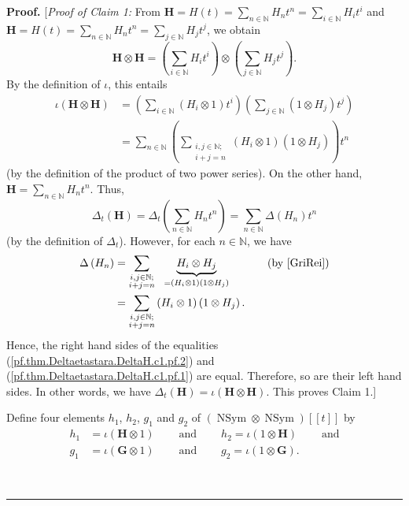 \documentclass[numbers=enddot,12pt,final,onecolumn,notitlepage]{scrartcl}%
\theoremstyle{definition}
\newenvironment{proof}[1][Proof]{\noindent\textbf{#1.} }{\ \rule{0.5em}{0.5em}}
\let\sumnonlimits\sum
\renewcommand{\sum}{\sumnonlimits\limits}
\begin{document}
\begin{proof}
[\textit{Proof of Claim 1:} From $\mathbf{H}=H\left(  t\right)  =\sum
_{n\in\mathbb{N}}H_{n}t^{n}=\sum_{i\in\mathbb{N}}H_{i}t^{i}$ and
$\mathbf{H}=H\left(  t\right)  =\sum_{n\in\mathbb{N}}H_{n}t^{n}=\sum
_{j\in\mathbb{N}}H_{j}t^{j}$, we obtain%
\[
\mathbf{H}\otimes\mathbf{H}=\left(  \sum_{i\in\mathbb{N}}H_{i}t^{i}\right)
\otimes\left(  \sum_{j\in\mathbb{N}}H_{j}t^{j}\right)  .
\]
By the definition of $\iota$, this entails%
\begin{align}
\iota\left(  \mathbf{H}\otimes\mathbf{H}\right)   &  =\left(  \sum
_{i\in\mathbb{N}}\left(  H_{i}\otimes1\right)  t^{i}\right)  \left(
\sum_{j\in\mathbb{N}}\left(  1\otimes H_{j}\right)  t^{j}\right) \nonumber\\
&  =\sum_{n\in\mathbb{N}}\left(  \sum_{\substack{i,j\in\mathbb{N}%
;\\i+j=n}}\left(  H_{i}\otimes1\right)  \left(  1\otimes H_{j}\right)
\right)  t^{n} \label{pf.thm.Deltaetastara.DeltaH.c1.pf.1}%
\end{align}
(by the definition of the product of two power series). On the other hand,
$\mathbf{H}=\sum_{n\in\mathbb{N}}H_{n}t^{n}$. Thus,%
\begin{equation}
\Delta_{t}\left(  \mathbf{H}\right)  =\Delta_{t}\left(  \sum_{n\in\mathbb{N}%
}H_{n}t^{n}\right)  =\sum_{n\in\mathbb{N}}\Delta\left(  H_{n}\right)  t^{n}
\label{pf.thm.Deltaetastara.DeltaH.c1.pf.2}%
\end{equation}
(by the definition of $\Delta_{t}$). However, for each $n\in\mathbb{N}$, we
have%
\begin{align*}
\Delta\left(  H_{n}\right)   &  =\sum_{\substack{i,j\in\mathbb{N}%
;\\i+j=n}}\ \ \underbrace{H_{i}\otimes H_{j}}_{=\left(  H_{i}\otimes1\right)
\left(  1\otimes H_{j}\right)  }\ \ \ \ \ \ \ \ \ \ \left(  \text{by
\cite[(5.4.2)]{GriRei}}\right) \\
&  =\sum_{\substack{i,j\in\mathbb{N};\\i+j=n}}\left(  H_{i}\otimes1\right)
\left(  1\otimes H_{j}\right)  .
\end{align*}
Hence, the right hand sides of the equalities
(\ref{pf.thm.Deltaetastara.DeltaH.c1.pf.2}) and
(\ref{pf.thm.Deltaetastara.DeltaH.c1.pf.1}) are equal. Therefore, so are their
left hand sides. In other words, we have $\Delta_{t}\left(  \mathbf{H}\right)
=\iota\left(  \mathbf{H}\otimes\mathbf{H}\right)  $. This proves Claim 1.]
\medskip

Define four elements $h_{1}$, $h_{2}$, $g_{1}$ and $g_{2}$ of $\left(
\operatorname*{NSym}\otimes\operatorname*{NSym}\right)  \left[  \left[
t\right]  \right]  $ by%
\begin{align*}
h_{1}  &  =\iota\left(  \mathbf{H}\otimes1\right)
\ \ \ \ \ \ \ \ \ \ \text{and}\ \ \ \ \ \ \ \ \ \ h_{2}=\iota\left(
1\otimes\mathbf{H}\right)  \ \ \ \ \ \ \ \ \ \ \text{and}\\
g_{1}  &  =\iota\left(  \mathbf{G}\otimes1\right)
\ \ \ \ \ \ \ \ \ \ \text{and}\ \ \ \ \ \ \ \ \ \ g_{2}=\iota\left(
1\otimes\mathbf{G}\right)  .
\end{align*}



\end{proof}
\end{document}
